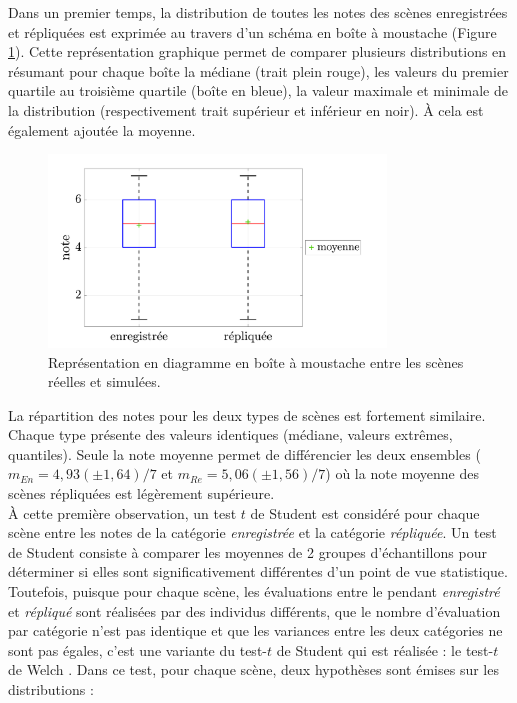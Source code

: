 Dans un premier temps, la distribution de toutes les notes des scènes enregistrées et répliquées est exprimée au travers d'un schéma en boîte à moustache (Figure \ref{fig:ANOVA_scene}). Cette représentation graphique permet de comparer plusieurs distributions en résumant pour chaque boîte la médiane (trait plein rouge), les valeurs du  premier quartile au troisième quartile (boîte en bleue), la valeur maximale et minimale de la distribution (respectivement trait supérieur et inférieur en noir). \`A cela est également ajoutée la moyenne.\\

\begin{figure}[h]
\centering
\includegraphics[width = 0.8\textwidth]{./figures/test_perceptif/testPerceptif_boxplotType.pdf}
\caption{Représentation en diagramme en boîte à moustache entre les scènes réelles et simulées.}\label{fig:ANOVA_scene}
\end{figure}

La répartition des notes pour les deux types de scènes est fortement similaire. Chaque type présente des valeurs identiques (médiane, valeurs extrêmes, quantiles). Seule la note moyenne permet de différencier les deux ensembles ($m_{En} = 4,93 (\pm 1,64) / 7$ et $m_{Re} = 5,06 (\pm 1,56) / 7$) où la note moyenne des scènes répliquées est légèrement supérieure.\\

À cette première observation, un test $t$ de Student est considéré pour chaque scène entre les notes de la catégorie \textit{enregistrée} et la catégorie \textit{répliquée}. Un test de Student consiste à comparer les moyennes de 2 groupes d'échantillons pour déterminer si elles sont significativement différentes d'un point de vue statistique. Toutefois, puisque pour chaque scène, les évaluations entre le pendant \textit{enregistré} et \textit{répliqué} sont réalisées par des individus différents, que le nombre d'évaluation par catégorie n'est pas identique et que les variances entre les deux catégories ne sont pas égales, c'est une variante du test-$t$ de Student qui est réalisée : le test-$t$ de Welch \cite{ruxton2006unequal}. Dans ce test, pour chaque scène, deux hypothèses sont émises sur les distributions :

